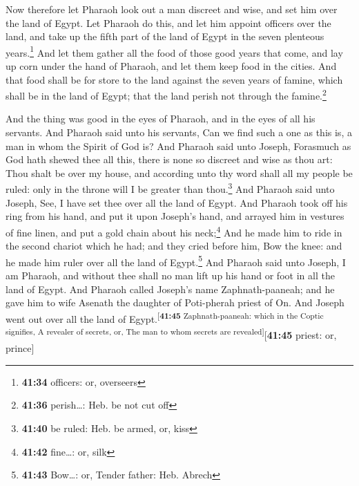  Now therefore let Pharaoh look out a man discreet and
wise, and set him over the land of Egypt.  Let Pharaoh do
this, and let him appoint officers over the land, and take up the fifth
part of the land of Egypt in the seven plenteous years.\footnote{\textbf{41:34}
  officers: or, overseers}  And let them gather all the
food of those good years that come, and lay up corn under the hand of
Pharaoh, and let them keep food in the cities.  And that
food shall be for store to the land against the seven years of famine,
which shall be in the land of Egypt; that the land perish not through
the famine.\footnote{\textbf{41:36} perish\ldots: Heb. be not cut off}

 And the thing was good in the eyes of Pharaoh, and in
the eyes of all his servants.  And Pharaoh said unto his
servants, Can we find such a one as this is, a man in whom the Spirit of
God is?  And Pharaoh said unto Joseph, Forasmuch as God
hath shewed thee all this, there is none so discreet and wise as thou
art:  Thou shalt be over my house, and according unto thy
word shall all my people be ruled: only in the throne will I be greater
than thou.\footnote{\textbf{41:40} be ruled: Heb. be armed, or, kiss}
 And Pharaoh said unto Joseph, See, I have set thee over
all the land of Egypt.  And Pharaoh took off his ring
from his hand, and put it upon Joseph's hand, and arrayed him in
vestures of fine linen, and put a gold chain about his neck;\footnote{\textbf{41:42}
  fine\ldots: or, silk}  And he made him to ride in the
second chariot which he had; and they cried before him, Bow the knee:
and he made him ruler over all the land of Egypt.\footnote{\textbf{41:43}
  Bow\ldots: or, Tender father: Heb. Abrech}  And Pharaoh
said unto Joseph, I am Pharaoh, and without thee shall no man lift up
his hand or foot in all the land of Egypt.  And Pharaoh
called Joseph's name Zaphnath-paaneah; and he gave him to wife Asenath
the daughter of Poti-pherah priest of On. And Joseph went out over all
the land of Egypt.\textsuperscript{{[}\textbf{41:45} Zaphnath-paaneah:
which in the Coptic signifies, A revealer of secrets, or, The man to
whom secrets are revealed{]}}{[}\textbf{41:45} priest: or, prince{]}

